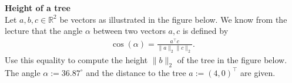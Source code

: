 \textbf{Height of a tree}\\
Let $a,b,c \in \mathbb{R}^2$ be vectors as illustrated in the figure below. We know from the lecture that the angle $\alpha$ between two vectors $a,c$ is defined by
\begin{align*}
\cos(\alpha) = \frac{a^\top c}{\| a\|_2 \|c \|_2}.
\end{align*}
Use this equality to compute the height $\| b \|_2$ of the tree in the figure below. The angle $\alpha := 36.87^{\circ}$ and the distance to the tree $ a := (4, 0)^\top$ are given.\\
